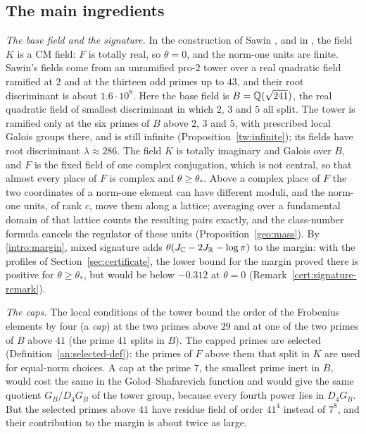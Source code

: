 

\subsection{The main ingredients}\label{intro:new}
\emph{The base field and the signature.} In the construction of Sawin
\cite{Sawin2026}, and in \cite{Naslund0358}, the field $K$ is a CM field:
$F$ is totally real, so $\theta=0$, and the norm-one units are finite.
Sawin's fields come from an unramified pro-$2$ tower over a real quadratic
field ramified at $2$ and at the thirteen odd primes up to $43$, and their
root discriminant is about $1.6\cdot10^8$. Here the base field is
$B=\mathbb Q(\sqrt{241})$, the real quadratic field of smallest discriminant in
which $2$, $3$ and $5$ all split. The tower is ramified only at the six
primes of $B$ above $2$, $3$ and $5$, with prescribed local Galois groups
there, and is still infinite (Proposition~\ref{tw:infinite}); its fields
have root discriminant $\lambda\approx286$. The field $K$ is totally
imaginary and Galois over $B$, and $F$ is the fixed field of one complex
conjugation, which is not central, so that almost every place of $F$ is
complex and $\theta\ge\theta_*$. Above a complex place of $F$ the two
coordinates of a norm-one element can have different moduli, and the
norm-one units, of rank $c$, move them along a lattice; averaging over a
fundamental domain of that lattice counts the resulting pairs exactly, and
the class-number formula cancels the regulator of these units
(Proposition~\ref{geo:mass}). By \eqref{intro:margin}, mixed signature adds
$\theta(J_\mathbb C-2J_\mathbb R-\log\pi)$ to the margin: with the profiles of
Section~\ref{sec:certificate}, the lower bound for the margin proved there
is positive for $\theta\ge\theta_*$, but would be below $-0.312$ at
$\theta=0$ (Remark~\ref{cert:signature-remark}).

\emph{The caps.} The local conditions of the tower bound the order of
the Frobenius elements by four (a \emph{cap}) at the two primes above
$29$ and at one of the two primes of $B$ above $41$ (the prime $41$ splits
in $B$). The capped primes are selected (Definition~\ref{an:selected-def}):
the primes of $F$ above them that split in $K$ are used for equal-norm
choices. A cap at the prime $7$, the smallest prime inert in $B$,
would cost the same in the Golod--Shafarevich function and would give the same
quotient $G_B/D_4G_B$ of the tower group, because every fourth power lies
in $D_4G_B$. But the selected primes above $41$ have residue field of
order $41^4$ instead of $7^8$, and their contribution to the margin is
about twice as large.

